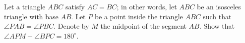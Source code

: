 Let a triangle $ABC$ satisfy $AC = BC$; in other words, let $ABC$ be an isosceles triangle with base $AB$. Let $P$ be a point inside the triangle $ABC$ such that $\angle PAB = \angle PBC$. Denote by $M$ the midpoint of the segment $AB$. Show that $\angle APM + \angle BPC = 180^{\circ}$.